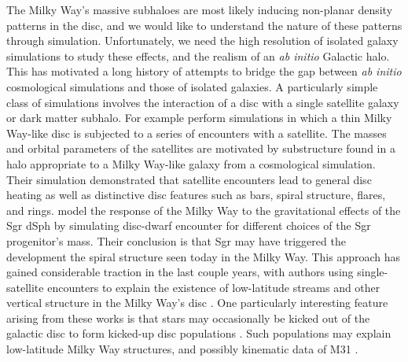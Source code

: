 The Milky Way's massive subhaloes are most likely inducing non-planar density patterns in the disc, and we would like to understand the nature of these patterns through simulation. Unfortunately, we need the high resolution of isolated galaxy simulations to study these effects, and the realism of an \textit{ab initio} Galactic halo.  This has motivated a long history of attempts to bridge the gap between {\it ab initio} cosmological simulations and those of isolated galaxies.  A particularly simple class of simulations involves the interaction of a disc
with a single satellite galaxy or dark matter subhalo.  For example \citet{kazantzidis2008} perform simulations in which a thin Milky Way-like disc is subjected to a series of encounters with a satellite.  The masses and orbital parameters of the satellites are motivated by substructure found in a halo appropriate to a Milky Way-like galaxy from a cosmological simulation.  Their simulation demonstrated that satellite encounters lead to general disc heating as well as distinctive disc features such as bars, spiral structure, flares, and rings.  \citet{purcell2011} model the response of the Milky Way to the gravitational effects of
the Sgr dSph by simulating disc-dwarf encounter for different choices of the Sgr progenitor's mass.  Their conclusion is that Sgr may have triggered the development the spiral structure seen today in the Milky Way.  This approach has gained considerable traction in the last couple years, with authors using single-satellite encounters to explain the existence of low-latitude streams and other vertical structure in the Milky Way's disc \citep[for example]{widrow_2014, dlv_2015, donghia_2016, laporte_2016, laporte_2018}. One particularly interesting feature arising from these works is that stars may occasionally be kicked out of the galactic disc to form kicked-up disc populations \citep{johnston_kud_review, laporte_2019_feathers}. Such populations may explain low-latitude Milky Way structures, and possibly kinematic data of M31 \citep{dorman_2013_m31}.



